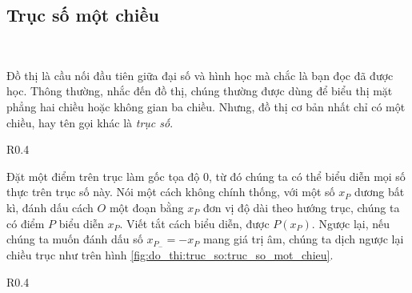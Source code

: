 \subsection{Trục số một chiều}

\ %

Đồ thị là cầu nối đầu tiên giữa đại số và hình học mà chắc là bạn đọc đã được học. Thông thường, nhắc đến đồ thị, chúng thường được dùng để biểu thị mặt phẳng hai chiều hoặc không gian ba chiều. Nhưng, đồ thị cơ bản nhất chỉ có một chiều, hay tên gọi khác là \emph{trục số}. 

\def \pointSize {1.5pt}

\begin{wrapfigure}{R}{0.4\textwidth}
   \centering
   \caption{Trục số một chiều}
   \label{fig:do_thi:truc_so:truc_so_mot_chieu}
\end{wrapfigure}

Đặt một điểm trên trục làm gốc tọa độ $0$, từ đó chúng ta có thể biểu diễn mọi số thực trên trục số này. Nói một cách không chính thống, với một số $x_P$ dương bất kì, đánh dấu cách $O$ một đoạn bằng $x_P$ đơn vị độ dài theo hướng trục, chúng ta có điểm $P$ biểu diễn $x_P$. Viết tắt cách biểu diễn, được $P(x_P)$. Ngược lại, nếu chúng ta muốn đánh dấu số $x_{P_-}=-x_P$ mang giá trị âm, chúng ta dịch ngược lại chiều trục như trên hình \ref{fig:do_thi:truc_so:truc_so_mot_chieu}.

\begin{wrapfigure}{R}{0.4\textwidth}
   \centering
   \caption{Khoảng cách trên trục số}
   \label{fig:do_thi:truc_so:khoang_cach_truc_so}
\end{wrapfigure}

